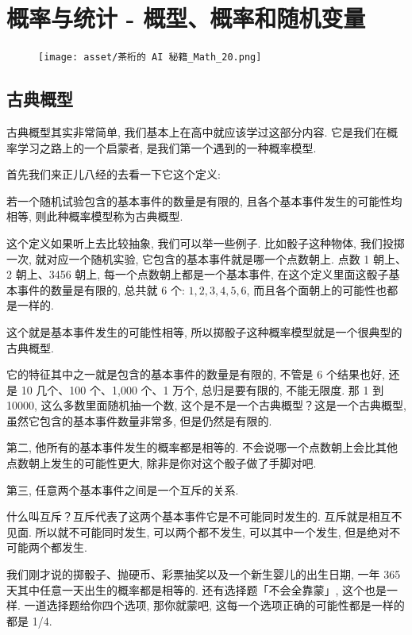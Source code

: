 \chapter{概率与统计 - 概型、概率和随机变量}

\begin{figure}[ht]
  \centering
  \texttt{[image: asset/茶桁的 AI 秘籍\_Math\_20.png]}
\end{figure}

\newpage

\section{古典概型}

古典概型其实非常简单, 我们基本上在高中就应该学过这部分内容. 它是我们在概率学习之路上的一个启蒙者, 是我们第一个遇到的一种概率模型. 

首先我们来正儿八经的去看一下它这个定义: 

\begin{newquotation}
若一个随机试验包含的基本事件的数量是有限的, 且各个基本事件发生的可能性均相等, 则此种概率模型称为古典概型. 
\end{newquotation}

这个定义如果听上去比较抽象, 我们可以举一些例子. 比如骰子这种物体, 我们投掷一次, 就对应一个随机实验, 它包含的基本事件就是哪一个点数朝上. 点数 1 朝上、2 朝上、3456 朝上, 每一个点数朝上都是一个基本事件, 在这个定义里面这骰子基本事件的数量是有限的, 总共就 6 个: $1, 2, 3, 4, 5, 6$, 而且各个面朝上的可能性也都是一样的. 

这个就是基本事件发生的可能性相等, 所以掷骰子这种概率模型就是一个很典型的古典概型. 

它的特征其中之一就是包含的基本事件的数量是有限的, 不管是 6 个结果也好, 还是 10 几个、100 个、1,000 个、1 万个, 总归是要有限的, 不能无限度. 那 1 到 10000, 这么多数里面随机抽一个数, 这个是不是一个古典概型？这是一个古典概型, 虽然它包含的基本事件数量非常多, 但是仍然是有限的. 

第二, 他所有的基本事件发生的概率都是相等的. 不会说哪一个点数朝上会比其他点数朝上发生的可能性更大, 除非是你对这个骰子做了手脚对吧. 

第三, 任意两个基本事件之间是一个互斥的关系. 

什么叫互斥？互斥代表了这两个基本事件它是不可能同时发生的. 互斥就是相互不见面. 所以就不可能同时发生, 可以两个都不发生, 可以其中一个发生, 但是绝对不可能两个都发生. 

我们刚才说的掷骰子、抛硬币、彩票抽奖以及一个新生婴儿的出生日期, 一年 365 天其中任意一天出生的概率都是相等的. 还有选择题「不会全靠蒙」, 这个也是一样. 一道选择题给你四个选项, 那你就蒙吧, 这每一个选项正确的可能性都是一样的都是 1/4. 

